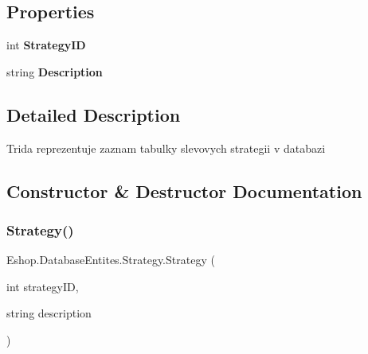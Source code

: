 \subsection*{Properties}
\begin{DoxyCompactItemize}
\item 
\mbox{\label{class_eshop_1_1_database_entites_1_1_strategy_a7efa749c2d9b583b79b4ae6f6ad227aa}} 
int {\bfseries Strategy\+ID}
\item 
\mbox{\label{class_eshop_1_1_database_entites_1_1_strategy_a2bbffe6f40b12ae81876f448daf70454}} 
string {\bfseries Description}
\end{DoxyCompactItemize}


\subsection{Detailed Description}
Trida reprezentuje zaznam tabulky slevovych strategii v databazi 



\subsection{Constructor \& Destructor Documentation}
\mbox{\label{class_eshop_1_1_database_entites_1_1_strategy_a660444eda01a2a5517174c32c981a946}} 
\subsubsection{\texorpdfstring{Strategy()}{Strategy()}}
{\footnotesize\ttfamily Eshop.\+Database\+Entites.\+Strategy.\+Strategy (\begin{DoxyParamCaption}\item[{int}]{strategy\+ID,  }\item[{string}]{description }\end{DoxyParamCaption})}



